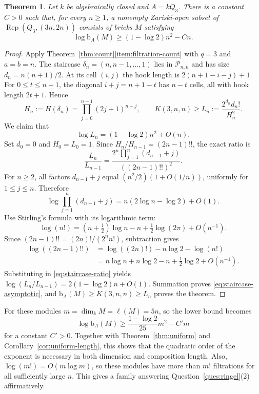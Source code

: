 \documentclass[a4paper,reqno,10pt]{amsart}
\newtheorem{theorem}{Theorem}[section]
\theoremstyle{definition}
\numberwithin{equation}{section}
\newcommand{\Rep}{\operatorname{Rep}}
\newcommand{\parts}{\mathcal P}
\newcommand{\bcount}{\mathrm b}
\begin{document}
\begin{theorem}\label{thm:growth}
Let $k$ be algebraically closed and $A=kQ_3$. There is a constant
$C>0$ such that, for every $n\geq1$,
a nonempty Zariski-open subset of $\Rep(Q_3,(3n,2n))$ consists of bricks
$M$ satisfying
\[
 \log\bcount_A(M)\geq(1-\log2)n^2-Cn.
\]
\end{theorem}

\begin{proof}
Apply Theorem~\ref{thm:count}\ref{item:filtration-count} with $q=3$ and $a=b=n$. The staircase
$\delta_n=(n,n-1,\ldots,1)$ lies in $\parts_{n,n}$ and has size
$d_n=n(n+1)/2$. At its cell $(i,j)$ the hook length is
$2(n+1-i-j)+1$. For $0\leq t\leq n-1$, the diagonal
$i+j=n+1-t$ has $n-t$ cells, all with hook length $2t+1$. Hence
\[
 H_n:=H(\delta_n)=\prod_{j=0}^{n-1}(2j+1)^{n-j},
 \qquad
 K(3,n,n)\geq L_n:=\frac{2^{d_n}d_n!}{H_n^2}.
\]
We claim that
\begin{equation}\label{eq:staircase-asymptotic}
 \log L_n=(1-\log2)n^2+O(n).
\end{equation}
Set $d_0=0$ and $H_0=L_0=1$. Since
$H_n/H_{n-1}=(2n-1)!!$, the exact ratio is
\begin{equation}\label{eq:staircase-ratio}
 \frac{L_n}{L_{n-1}}
   =\frac{2^n\prod_{j=1}^n(d_{n-1}+j)}{((2n-1)!!)^2}.
\end{equation}
For $n\geq2$, all factors $d_{n-1}+j$ equal
$(n^2/2)(1+O(1/n))$, uniformly for $1\leq j\leq n$. Therefore
\[
 \log\prod_{j=1}^n(d_{n-1}+j)
     =n(2\log n-\log2)+O(1).
\]
Use Stirling's formula with its logarithmic term:
\[
 \log(n!)=(n+\tfrac12)\log n-n+\tfrac12\log(2\pi)+O(n^{-1}).
\]
Since $(2n-1)!!=(2n)!/(2^n n!)$, subtraction gives
\begin{align*}
 \log((2n-1)!!)
 &=\log((2n)!)-n\log2-\log(n!)\\
 &=n\log n+n\log2-n+\tfrac12\log2+O(n^{-1}).
\end{align*}
Substituting in \eqref{eq:staircase-ratio} yields
$\log(L_n/L_{n-1})=2(1-\log2)n+O(1)$.
Summation proves \eqref{eq:staircase-asymptotic}, and
$\bcount_A(M)\geq K(3,n,n)\geq L_n$ proves the theorem.
\end{proof}

For these modules $m=\dim_k M=\ell(M)=5n$, so the lower bound becomes
\[
 \log\bcount_A(M)\geq\frac{1-\log2}{25}m^2-C'm
\]
for a constant $C'>0$. Together with Theorem~\ref{thm:uniform} and
Corollary~\ref{cor:uniform-length}, this shows that the quadratic order
of the exponent is necessary in both dimension and composition length.
Also, $\log(m!)=O(m\log m)$, so these modules have more than $m!$
filtrations for all sufficiently large $n$. This gives a family
answering Question~\ref{ques:ringel}(2) affirmatively.
\end{document}

